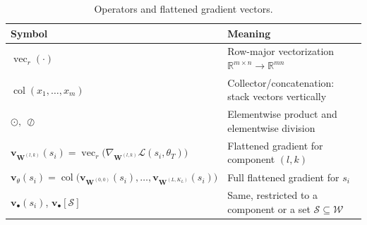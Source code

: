\begin{table}[H]
    \centering
    \small
    \begin{tabular}{ll}
        \textbf{Symbol} & \textbf{Meaning} \\
        \hline
        $\operatorname{vec}_r(\cdot)$ & Row-major vectorization $\mathbb{R}^{m\times n}\!\to\!\mathbb{R}^{mn}$ \\
        $\operatorname{col}(x_1,\dots,x_m)$ & Collector/concatenation: stack vectors vertically \\
        $\odot,\ \oslash$ & Elementwise product and elementwise division \\
        $\mathbf{v}_{\mathbf{W}^{(l,k)}}(s_i)=\operatorname{vec}_r\big(\nabla_{\mathbf{W}^{(l,k)}}\mathcal{L}(s_i,\theta_T)\big)$ & Flattened gradient for component $(l,k)$ \\
        $\mathbf{v}_{\theta}(s_i)=\operatorname{col}\big(\mathbf{v}_{\mathbf{W}^{(0,0)}}(s_i),\dots,\mathbf{v}_{\mathbf{W}^{(L,K_L)}}(s_i)\big)$ & Full flattened gradient for $s_i$ \\
        $\mathbf{v}_{\bullet}(s_i)$, $\mathbf{v}_{\bullet}[\mathcal{S}]$ & Same, restricted to a component or a set $\mathcal{S}\subseteq\mathcal{W}$ \\
    \end{tabular}
    \caption{Operators and flattened gradient vectors.}
    \label{tab:nomenclature-ops}
\end{table}


